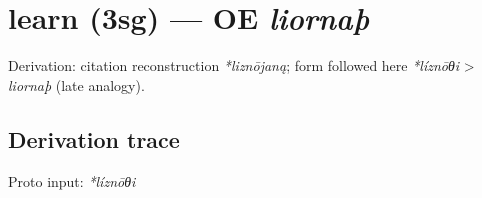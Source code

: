 \documentclass[
  british,
  a4paper,
  openany]{book}
\providecommand{\texorpdfstring}[2]{#1}
\begin{document}
\section{\texorpdfstring{learn (3sg) --- OE
\emph{liornaþ}}{learn (3sg) --- OE liornaþ}}\label{learn-3sg-oe-liornauxfe}


Derivation: citation reconstruction \emph{*liznōjaną}; form followed
here \emph{*líznōθi} \textgreater{} \emph{liornaþ} (late analogy).

\subsection{Derivation trace}\label{derivation-trace-131}

Proto input: \emph{*líznōθi}

\begingroup
\setlength{\fboxsep}{6pt}
\end{document}
